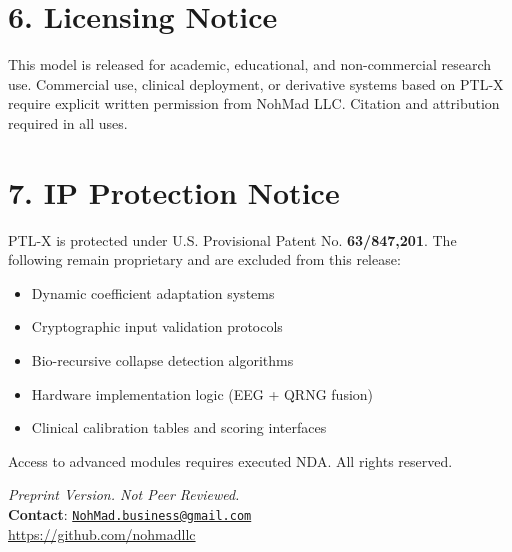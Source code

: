 \documentclass[12pt]{article}
\begin{document}
\section*{6. Licensing Notice}
This model is released for academic, educational, and non-commercial research use. Commercial use, clinical deployment, or derivative systems based on PTL-X require explicit written permission from NohMad LLC. Citation and attribution required in all uses.

\section*{7. IP Protection Notice}
PTL-X is protected under U.S. Provisional Patent No. \textbf{63/847,201}. The following remain proprietary and are excluded from this release:
\begin{itemize}[label=\textbullet,itemsep=0pt]
    \item Dynamic coefficient adaptation systems
    \item Cryptographic input validation protocols
    \item Bio-recursive collapse detection algorithms
    \item Hardware implementation logic (EEG + QRNG fusion)
    \item Clinical calibration tables and scoring interfaces
\end{itemize}
Access to advanced modules requires executed NDA. All rights reserved.

\begin{center}
\textit{Preprint Version. Not Peer Reviewed.} \\
\textbf{Contact}: \href{mailto:NohMad.business@gmail.com}{\texttt{NohMad.business@gmail.com}} \\
\vspace{0.5em}
\url{https://github.com/nohmadllc}
\end{center}
\end{document}

